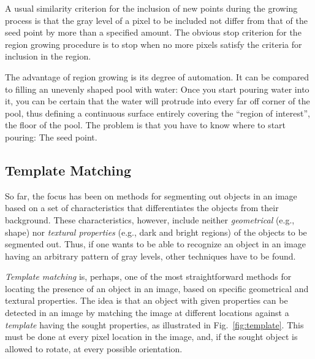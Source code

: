A usual similarity criterion for the inclusion of new points during
the growing process is that the gray level of a pixel to be included
not differ from that of the seed point by more than a specified
amount.  The obvious stop criterion for the region growing procedure
is to stop when no more pixels satisfy the criteria for inclusion in
the region.

The advantage of region growing is its degree of automation.  It can
be compared to filling an unevenly shaped pool with water: Once you
start pouring water into it, you can be certain that the water will
protrude into every far off corner of the pool, thus defining a
continuous surface entirely covering the ``region of interest'', the
floor of the pool.  The problem is that you have to know where to
start pouring: The seed point.

\subsection{Template Matching}
\label{image:segment:template}

So far, the focus has been on methods for segmenting out objects in an
image based on a set of characteristics that differentiates the
objects from their background.  These characteristics, however,
include neither {\em geometrical\/} (e.g., shape) nor {\em textural
  properties\/} (e.g., dark and bright regions) of the objects to be
segmented out.  Thus, if one wants to be able to recognize an object
in an image having an arbitrary pattern of gray levels, other
techniques have to be found.

{\em Template matching\/} is, perhaps, one of the most straightforward
methods for locating the presence of an object in an image, based on
specific geometrical and textural properties.  The idea is that an
object with given properties can be detected in an image by matching
the image at different locations against a {\em template\/} having the
sought properties, as illustrated in Fig.~\ref{fig:template}.  This
must be done at every pixel location in the image, and, if the sought
object is allowed to rotate, at every possible orientation.



